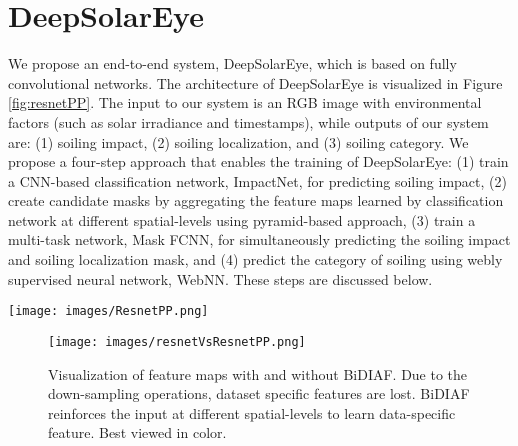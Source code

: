 \documentclass[10pt,twocolumn,letterpaper]{article}
\begin{document}
\section{DeepSolarEye}
\vspace{-2mm}
We propose an end-to-end system, DeepSolarEye, which is based on fully convolutional networks. The architecture of DeepSolarEye is visualized in Figure \ref{fig:resnetPP}. The input to our system is an RGB image with environmental factors (such as solar irradiance and timestamps), while outputs of our system are: (1) soiling impact, (2) soiling localization, and (3) soiling  category. We propose a four-step approach that enables the training of DeepSolarEye: (1) train a CNN-based classification network, ImpactNet, for predicting soiling impact, (2) create candidate masks by aggregating the feature maps learned by classification network at different spatial-levels using pyramid-based approach, (3) train a multi-task network, Mask FCNN, for simultaneously predicting the soiling impact and soiling localization mask, and (4) predict the category of soiling using webly supervised neural network, WebNN. These steps are discussed below.
\begin{figure*}[ht]
\centering
\texttt{[image: images/ResnetPP.png]}
\setlength{\belowcaptionskip}{-4mm}
\caption{DeepSolarEye: An end-to-end system for predicting the soiling impact, the soiling localization, and the soiling type simultaneously. Number of feature maps used by each block are reported next to it. Note that $1^{\textrm{st}}$ AU doesn't have $x^l_A$. Best viewed in color.}
\label{fig:resnetPP}
\end{figure*}
\begin{figure}[t!]
\centering
\setlength{\belowcaptionskip}{-4mm}
\texttt{[image: images/resnetVsResnetPP.png]}
\caption{Visualization of feature maps with and without BiDIAF. Due to the down-sampling operations, dataset specific features are lost. BiDIAF reinforces the input at different spatial-levels to learn data-specific feature. Best viewed in color.}
\label{fig:resVsResPP}
\end{figure}
\end{document}

